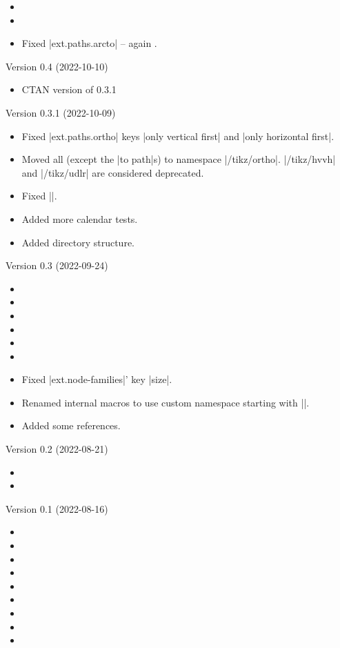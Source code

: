 \begin{multicols}{2}
\begin{itemize}
\item {}
\item {}
\item Fixed |ext.paths.arcto| -- again \cite{GH2}.
\end{itemize}
Version 0.4 (2022-10-10)
\begin{itemize}
\item CTAN version of 0.3.1
\end{itemize}
Version 0.3.1 (2022-10-09)
\begin{itemize}
\item Fixed |ext.paths.ortho| keys |only vertical first| and |only horizontal first|.
\item Moved all (except the |to path|s) to namespace |/tikz/ortho|.
     |/tikz/hvvh| and |/tikz/udlr| are considered deprecated.
\item Fixed |\pgfcalendarjulianyeartoweek|.
\item Added more calendar tests.
\item Added directory structure.
\end{itemize}
Version 0.3 (2022-09-24)
\begin{itemize}
\item {}
\item {}
\item {}
\item {}
\item {}
\item {}
\item Fixed |ext.node-families|' key |size|.
\item Renamed internal macros to use custom namespace starting with |\tikzext@|.
\item Added some references.
\end{itemize}
Version 0.2 (2022-08-21)
\begin{itemize}
\item {}
\item {}
\end{itemize}
Version 0.1 (2022-08-16)
\begin{itemize}
\item {}
\item {}
\item {}
\item {}
\item {}
\item {}
\item {}
\item {}
\item {}
\end{itemize}
\end{multicols}
\printindex

